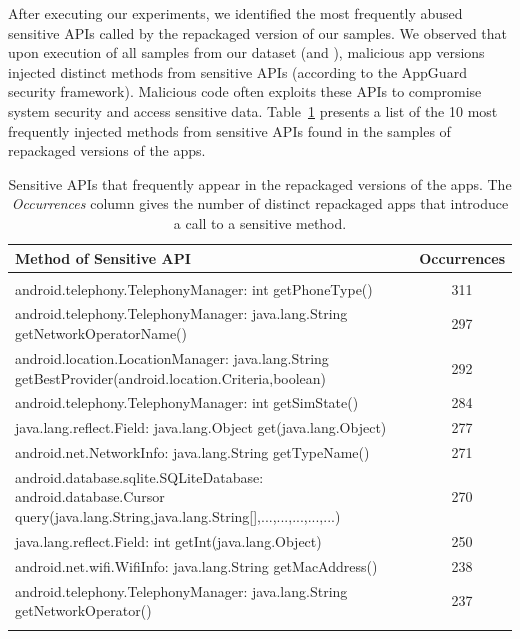 After executing our experiments, we identified the  most frequently abused sensitive APIs called by the repackaged version of our samples.
We observed that upon execution of all samples from our dataset (\sds and \cds), malicious app versions injected  distinct methods from sensitive APIs (according to the
AppGuard~\cite{DBLP:conf/esorics/BackesGHMS13} security framework).
Malicious code often exploits these APIs to compromise system security and access sensitive data. Table~\ref{tab:APIused}
presents a list of the 10 most frequently injected methods from sensitive APIs found in the
\cds samples of repackaged versions of the apps.



\begin{table}
\caption{Sensitive APIs that frequently appear in the repackaged versions of the apps. The
    \emph{Occurrences} column gives the number of distinct repackaged apps that introduce a call
  to a sensitive method.}\label{tab:APIused}
\begin{tabular*}{\textheight}{@{\extracolsep\fill}lc}

 \hline
    Method of Sensitive API & Occurrences \\
    \hline \\
    android.telephony.TelephonyManager: int getPhoneType() &  311\\
    android.telephony.TelephonyManager: java.lang.String getNetworkOperatorName() &  297 \\
    android.location.LocationManager: java.lang.String getBestProvider(android.location.Criteria,boolean) &  292 \\
    android.telephony.TelephonyManager: int getSimState() &	284\\
 java.lang.reflect.Field: java.lang.Object get(java.lang.Object)&	277\\
    android.net.NetworkInfo: java.lang.String getTypeName() &  271\\
    android.database.sqlite.SQLiteDatabase: android.database.Cursor query(java.lang.String,java.lang.String[],...,...,...,...,...) &  270 \\
       java.lang.reflect.Field: int getInt(java.lang.Object) &  250\\
        android.net.wifi.WifiInfo: java.lang.String getMacAddress()	& 238\\
    
    android.telephony.TelephonyManager: java.lang.String getNetworkOperator() &  237\\


\botrule
\end{tabular*}

\end{table}





